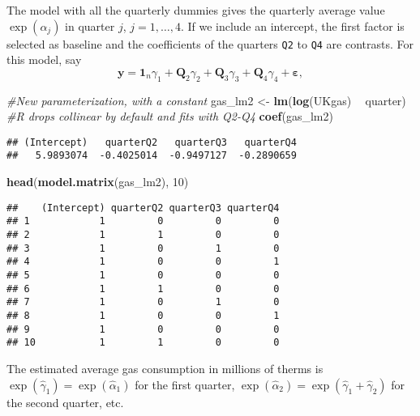 \documentclass[]{book}
\newenvironment{Shaded}{\begin{snugshade}}{\end{snugshade}}
\newcommand{\CommentTok}[1]{\textcolor[rgb]{0.56,0.35,0.01}{\textit{#1}}}
\newcommand{\DecValTok}[1]{\textcolor[rgb]{0.00,0.00,0.81}{#1}}
\newcommand{\KeywordTok}[1]{\textcolor[rgb]{0.13,0.29,0.53}{\textbf{#1}}}
\newcommand{\NormalTok}[1]{#1}
\newcommand{\OperatorTok}[1]{\textcolor[rgb]{0.81,0.36,0.00}{\textbf{#1}}}
\newcommand{\StringTok}[1]{\textcolor[rgb]{0.31,0.60,0.02}{#1}}
\theoremstyle{definition}
\theoremstyle{definition}
\theoremstyle{definition}
\theoremstyle{remark}
\begin{document}
The model with all the quarterly dummies gives the quarterly average
value \(\exp(\alpha_j)\) in quarter \(j\), \(j = 1, \ldots, 4\). If we
include an intercept, the first factor is selected as baseline and the
coefficients of the quarters \texttt{Q2} to \texttt{Q4} are contrasts.
For this model, say
\[ \boldsymbol{y} = \mathbf{1}_n \gamma_1 + \mathbf{Q}_2 \gamma_2 + \mathbf{Q}_3 \gamma_3 + \mathbf{Q}_4 \gamma_4 + \boldsymbol{\varepsilon},
\]

\begin{Shaded}
\begin{Highlighting}[]
\CommentTok{#New parameterization, with a constant}
\NormalTok{gas_lm2 <-}\StringTok{ }\KeywordTok{lm}\NormalTok{(}\KeywordTok{log}\NormalTok{(UKgas) }\OperatorTok{~}\StringTok{ }\NormalTok{quarter) }\CommentTok{#R drops collinear by default and fits with Q2-Q4}
\KeywordTok{coef}\NormalTok{(gas_lm2)}
\end{Highlighting}
\end{Shaded}

\begin{verbatim}
## (Intercept)   quarterQ2   quarterQ3   quarterQ4 
##   5.9893074  -0.4025014  -0.9497127  -0.2890659
\end{verbatim}

\begin{Shaded}
\begin{Highlighting}[]
\KeywordTok{head}\NormalTok{(}\KeywordTok{model.matrix}\NormalTok{(gas_lm2), }\DecValTok{10}\NormalTok{)}
\end{Highlighting}
\end{Shaded}

\begin{verbatim}
##    (Intercept) quarterQ2 quarterQ3 quarterQ4
## 1            1         0         0         0
## 2            1         1         0         0
## 3            1         0         1         0
## 4            1         0         0         1
## 5            1         0         0         0
## 6            1         1         0         0
## 7            1         0         1         0
## 8            1         0         0         1
## 9            1         0         0         0
## 10           1         1         0         0
\end{verbatim}

The estimated average gas consumption in millions of therms is
\(\exp(\widehat{\gamma}_1)=\exp(\widehat{\alpha}_1)\) for the first
quarter,
\(\exp(\widehat{\alpha}_2)=\exp(\widehat{\gamma}_1+\widehat{\gamma}_2)\)
for the second quarter, etc.
\end{document}
